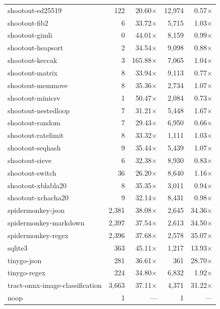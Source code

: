 \begin{longtable}{l r r r r}
shootout-ed25519 & 122 & 20.60$\times$ & 12{,}974 & 0.57$\times$ \\
shootout-fib2 & 6 & 33.72$\times$ & 5{,}715 & 1.03$\times$ \\
shootout-gimli & 0 & 44.01$\times$ & 8{,}159 & 0.99$\times$ \\
shootout-heapsort & 2 & 34.54$\times$ & 9{,}098 & 0.88$\times$ \\
shootout-keccak & 3 & 165.88$\times$ & 7{,}065 & 1.04$\times$ \\
shootout-matrix & 8 & 33.94$\times$ & 9{,}113 & 0.77$\times$ \\
shootout-memmove & 8 & 35.36$\times$ & 2{,}734 & 1.07$\times$ \\
shootout-minicsv & 1 & 50.47$\times$ & 2{,}084 & 0.73$\times$ \\
shootout-nestedloop & 7 & 31.21$\times$ & 5{,}448 & 1.67$\times$ \\
shootout-random & 7 & 29.43$\times$ & 6{,}950 & 0.66$\times$ \\
shootout-ratelimit & 8 & 33.32$\times$ & 1{,}111 & 1.03$\times$ \\
shootout-seqhash & 9 & 35.44$\times$ & 5{,}439 & 1.07$\times$ \\
shootout-sieve & 6 & 32.38$\times$ & 8{,}930 & 0.83$\times$ \\
shootout-switch & 36 & 26.20$\times$ & 8{,}640 & 1.16$\times$ \\
shootout-xblabla20 & 8 & 35.35$\times$ & 3{,}011 & 0.94$\times$ \\
shootout-xchacha20 & 9 & 32.14$\times$ & 8{,}431 & 0.98$\times$ \\
spidermonkey-json & 2{,}381 & 38.08$\times$ & 2{,}645 & 34.36$\times$ \\
spidermonkey-markdown & 2{,}397 & 37.54$\times$ & 2{,}613 & 34.50$\times$ \\
spidermonkey-regex & 2{,}396 & 37.68$\times$ & 2{,}578 & 35.07$\times$ \\
sqlite3 & 363 & 45.11$\times$ & 1{,}217 & 13.93$\times$ \\
tinygo-json & 281 & 36.61$\times$ & 361 & 28.70$\times$ \\
tinygo-regex & 224 & 34.80$\times$ & 6{,}832 & 1.92$\times$ \\
tract-onnx-image-classification & 3{,}663 & 37.11$\times$ & 4{,}371 & 31.22$\times$ \\
noop & 1 & --- & 1 & --- \\
\end{longtable}

